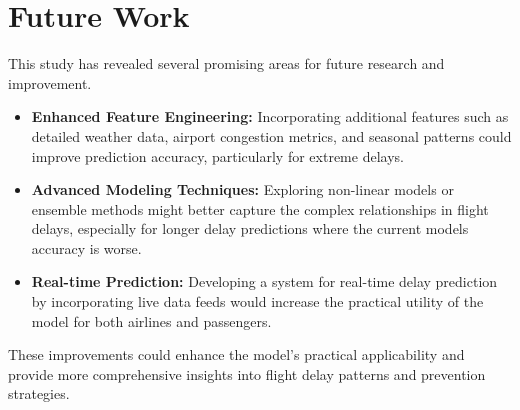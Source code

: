 \section{Future Work}
This study has revealed several promising areas for future research and improvement.
\begin{itemize}
\item \textbf{Enhanced Feature Engineering:} Incorporating additional features such as detailed weather data, airport congestion metrics, and seasonal patterns could improve prediction accuracy, particularly for extreme delays.

\item \textbf{Advanced Modeling Techniques:} Exploring non-linear models or ensemble methods might better capture the complex relationships in flight delays, especially for longer delay predictions where the current models accuracy is worse.

\item \textbf{Real-time Prediction:} Developing a system for real-time delay prediction by incorporating live data feeds would increase the practical utility of the model for both airlines and passengers.

\end{itemize}
These improvements could enhance the model's practical applicability and provide more comprehensive insights into flight delay patterns and prevention strategies.